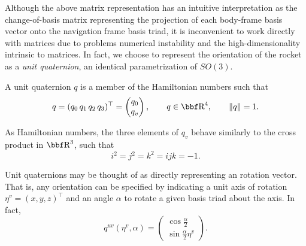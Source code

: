\documentclass{article}
\begin{document}
Although the above matrix representation has an intuitive interpretation as the change-of-basis matrix representing the projection of each body-frame basis vector onto the navigation frame basis triad, it is inconvenient to work directly with matrices due to problems numerical instability and the high-dimensionality intrinsic to matrices. In fact, we choose to represent the orientation of the rocket as a \textit{unit quaternion}, an identical parametrization of $SO(3)$.

A unit quaternion $q$ is a member of the Hamiltonian numbers such that 
\[
q = (q_0 \, q_1 \, q_2 \, q_3)^\top = 
\begin{pmatrix}
q_0\\
q_v
\end{pmatrix}, 
\qquad q \in \RR^4, \qquad \norm{q} = 1.
\]

As Hamiltonian numbers, the three elements of $q_v$ behave similarly to the cross product in $\RR^3$, such that 
\[
i^2 = j^2 = k^2 = ijk = -1.
\]

Unit quaternions may be thought of as directly representing an rotation vector. That is, any orientation can be specified by indicating a unit axis of rotation $\eta^v = (x, y, z)^\top$ and an angle $\alpha$ to rotate a given basis triad about the axis. In fact,
\[
q^{uv}(\eta^v, \alpha) = 
\begin{pmatrix}
\cos \frac{\alpha}{2}\\
\sin \frac{\alpha}{2} \eta^v
\end{pmatrix}.
\]
\end{document}
